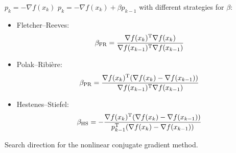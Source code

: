 \begin{algorithm}
  \begin{algorithmic}[1]
      \State $p_k = -\nabla f(x_k)$
    \Else
      \State $p_k = -\nabla f(x_k) + \beta p_{k-1}$
  with different strategies for $\beta$:
  \begin{itemize}
    \item Fletcher--Reeves:
      \[
        \beta_{\text{FR}}=\frac{\nabla f(x_k)^{\text{\upshape T}} \nabla f(x_k)}{\nabla f(x_{k-1})^{\text{\upshape T}} \nabla f(x_{k-1})}
        \]
       \item Polak--Ribi\`ere:
         \[
           \beta_{\text{PR}}=\frac{\nabla f(x_k)^{\text{\upshape T}} (\nabla f(x_k)-\nabla f(x_{k-1}))}{\nabla f(x_{k-1})^{\text{\upshape T}} \nabla f(x_{k-1})}
      \]
    \item Hestenes--Stiefel:
         \[
           \beta_{\text{HS}}=-\frac{\nabla f(x_k)^{\text{\upshape T}} (\nabla f(x_k)-\nabla f(x_{k-1}))}{p_{k-1}^{\text{\upshape T}} (\nabla f(x_{k}) - \nabla f(x_{k-1}))}
      \]
  \end{itemize}
    \EndIf
  \end{algorithmic}
  \caption{Search direction for the nonlinear conjugate gradient method.}
  \label{alg:cg}
\end{algorithm}






